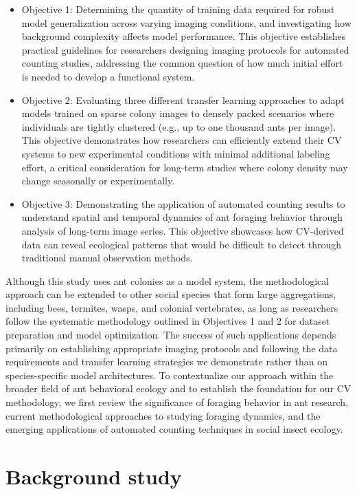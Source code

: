 \begin{itemize}
    \item Objective 1: Determining the quantity of training data required for robust model generalization across varying imaging conditions, and investigating how background complexity affects model performance. This objective establishes practical guidelines for researchers designing imaging protocols for automated counting studies, addressing the common question of how much initial effort is needed to develop a functional system.
    \item Objective 2: Evaluating three different transfer learning approaches to adapt models trained on sparse colony images to densely packed scenarios where individuals are tightly clustered (e.g., up to one thousand ants per image). This objective demonstrates how researchers can efficiently extend their CV systems to new experimental conditions with minimal additional labeling effort, a critical consideration for long-term studies where colony density may change seasonally or experimentally.
    \item Objective 3: Demonstrating the application of automated counting results to understand spatial and temporal dynamics of ant foraging behavior through analysis of long-term image series. This objective showcases how CV-derived data can reveal ecological patterns that would be difficult to detect through traditional manual observation methods.
\end{itemize}

Although this study uses ant colonies as a model system, the methodological approach can be extended to other social species that form large aggregations, including bees, termites, wasps, and colonial vertebrates, as long as researchers follow the systematic methodology outlined in Objectives 1 and 2 for dataset preparation and model optimization. The success of such applications depends primarily on establishing appropriate imaging protocols and following the data requirements and transfer learning strategies we demonstrate rather than on species-specific model architectures. To contextualize our approach within the broader field of ant behavioral ecology and to establish the foundation for our CV methodology, we first review the significance of foraging behavior in ant research, current methodological approaches to studying foraging dynamics, and the emerging applications of automated counting techniques in social insect ecology.

\section{Background study}

